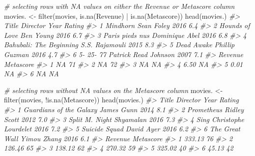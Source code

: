 \documentclass[
]{book}
\newenvironment{Shaded}{\begin{snugshade}}{\end{snugshade}}
\newcommand{\CommentTok}[1]{\textcolor[rgb]{0.56,0.35,0.01}{\textit{#1}}}
\newcommand{\FunctionTok}[1]{\textcolor[rgb]{0.00,0.00,0.00}{#1}}
\newcommand{\NormalTok}[1]{#1}
\newcommand{\OtherTok}[1]{\textcolor[rgb]{0.56,0.35,0.01}{#1}}
\newcommand{\SpecialCharTok}[1]{\textcolor[rgb]{0.00,0.00,0.00}{#1}}
\begin{document}
\begin{Shaded}
\begin{Highlighting}[]
\CommentTok{\# selecting rows with NA values on either the Revenue or Metascore column}
\NormalTok{movies. }\OtherTok{\textless{}{-}} \FunctionTok{filter}\NormalTok{(movies, }\FunctionTok{is.na}\NormalTok{(Revenue) }\SpecialCharTok{|} \FunctionTok{is.na}\NormalTok{(Metascore))}
\FunctionTok{head}\NormalTok{(movies.)}
\CommentTok{\#\textgreater{}                     Title             Director Year Rating}
\CommentTok{\#\textgreater{} 1                Mindhorn           Sean Foley 2016    6.4}
\CommentTok{\#\textgreater{} 2          Hounds of Love            Ben Young 2016    6.7}
\CommentTok{\#\textgreater{} 3         Paris pieds nus       Dominique Abel 2016    6.8}
\CommentTok{\#\textgreater{} 4 Bahubali: The Beginning       S.S. Rajamouli 2015    8.3}
\CommentTok{\#\textgreater{} 5              Dead Awake       Phillip Guzman 2016    4.7}
\CommentTok{\#\textgreater{} 6               5{-} 25{-} 77 Patrick Read Johnson 2007    7.1}
\CommentTok{\#\textgreater{}   Revenue Metascore}
\CommentTok{\#\textgreater{} 1      NA        71}
\CommentTok{\#\textgreater{} 2      NA        72}
\CommentTok{\#\textgreater{} 3      NA        NA}
\CommentTok{\#\textgreater{} 4    6.50        NA}
\CommentTok{\#\textgreater{} 5    0.01        NA}
\CommentTok{\#\textgreater{} 6      NA        NA}

\CommentTok{\# selecting rows without NA values on the Metascore column }
\NormalTok{movies. }\OtherTok{\textless{}{-}} \FunctionTok{filter}\NormalTok{(movies, }\SpecialCharTok{!}\FunctionTok{is.na}\NormalTok{(Metascore))}
\FunctionTok{head}\NormalTok{(movies.)}
\CommentTok{\#\textgreater{}                     Title             Director Year Rating}
\CommentTok{\#\textgreater{} 1 Guardians of the Galaxy           James Gunn 2014    8.1}
\CommentTok{\#\textgreater{} 2              Prometheus         Ridley Scott 2012    7.0}
\CommentTok{\#\textgreater{} 3                   Split   M. Night Shyamalan 2016    7.3}
\CommentTok{\#\textgreater{} 4                    Sing Christophe Lourdelet 2016    7.2}
\CommentTok{\#\textgreater{} 5           Suicide Squad           David Ayer 2016    6.2}
\CommentTok{\#\textgreater{} 6          The Great Wall          Yimou Zhang 2016    6.1}
\CommentTok{\#\textgreater{}   Revenue Metascore}
\CommentTok{\#\textgreater{} 1  333.13        76}
\CommentTok{\#\textgreater{} 2  126.46        65}
\CommentTok{\#\textgreater{} 3  138.12        62}
\CommentTok{\#\textgreater{} 4  270.32        59}
\CommentTok{\#\textgreater{} 5  325.02        40}
\CommentTok{\#\textgreater{} 6   45.13        42}


\end{Highlighting}
\end{Shaded}
\end{document}
